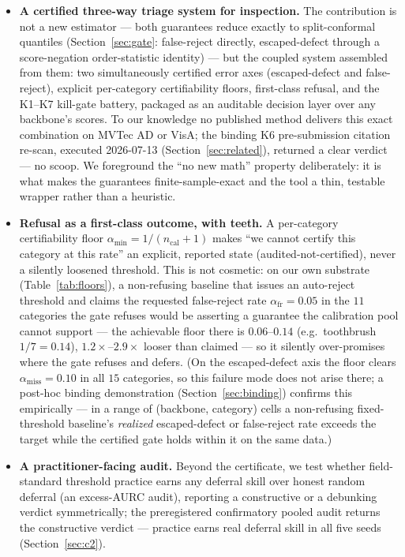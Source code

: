 \documentclass[preprint,11pt]{elsarticle}
\begin{document}
\begin{itemize}
  \item \textbf{A certified three-way triage system for inspection.} The contribution is not
        a new estimator --- both guarantees reduce exactly to split-conformal quantiles
        (Section~\ref{sec:gate}: false-reject directly, escaped-defect through a score-negation
        order-statistic identity) --- but the coupled system assembled from them: two
        simultaneously certified error axes (escaped-defect and false-reject), explicit
        per-category certifiability floors, first-class refusal, and the K1--K7 kill-gate battery,
        packaged as an auditable decision layer over any backbone's scores. To our knowledge no
        published method delivers this exact combination on MVTec AD or VisA; the binding K6
        pre-submission citation re-scan, executed 2026-07-13 (Section~\ref{sec:related}), returned a
        clear verdict --- no scoop. We foreground the ``no new math''
        property deliberately: it is what makes the guarantees finite-sample-exact and the tool a
        thin, testable wrapper rather than a heuristic.
  \item \textbf{Refusal as a first-class outcome, with teeth.} A per-category certifiability floor
        $\alpha_{\min}=1/(n_{\text{cal}}+1)$ makes ``we cannot certify this category at this rate''
        an explicit, reported state (audited-not-certified), never a silently loosened threshold.
        This is not cosmetic: on our own substrate (Table~\ref{tab:floors}), a non-refusing baseline
        that issues an auto-reject threshold and claims the requested false-reject rate
        $\alpha_{\text{fr}}=0.05$ in the $11$ categories the gate refuses would be asserting a
        guarantee the calibration pool cannot support --- the achievable floor there is
        $0.06$--$0.14$ (e.g.\ toothbrush $1/7=0.14$), $1.2\times$--$2.9\times$ looser than claimed --- so
        it silently over-promises where the gate refuses and defers. (On the escaped-defect axis the
        floor clears $\alpha_{\text{miss}}=0.10$ in all $15$ categories, so this failure mode does
        not arise there; a post-hoc binding demonstration (Section~\ref{sec:binding}) confirms this
        empirically --- in a range of (backbone, category) cells a non-refusing fixed-threshold
        baseline's \emph{realized} escaped-defect or false-reject rate exceeds the target while the
        certified gate holds within it on the same data.)
  \item \textbf{A practitioner-facing audit.} Beyond the certificate, we test whether
        field-standard threshold practice earns any deferral skill over honest random deferral
        (an excess-AURC audit), reporting a constructive or a debunking verdict symmetrically; the
        preregistered confirmatory pooled audit returns the constructive verdict --- practice earns
        real deferral skill in all five seeds (Section~\ref{sec:c2}).
\end{itemize}
\end{document}
